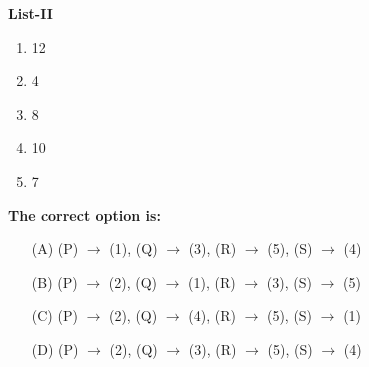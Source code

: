 \documentclass[12pt,a4paper]{article}
\begin{document}
\textbf{List-II}
\begin{enumerate}
\item 12 
\item 4
\item 8
\item 10
\item 7
\end{enumerate}

\textbf{The correct option is:}
\begin{enumerate}
    \item[(A)] (P) $\rightarrow$ (1), (Q) $\rightarrow$ (3), (R) $\rightarrow$ (5), (S) $\rightarrow$ (4)
    \item[(B)] (P) $\rightarrow$ (2), (Q) $\rightarrow$ (1), (R) $\rightarrow$ (3), (S) $\rightarrow$ (5)
    \item[(C)] (P) $\rightarrow$ (2), (Q) $\rightarrow$ (4), (R) $\rightarrow$ (5), (S) $\rightarrow$ (1)
    \item[(D)] (P) $\rightarrow$ (2), (Q) $\rightarrow$ (3), (R) $\rightarrow$ (5), (S) $\rightarrow$ (4)
\end{enumerate}
\end{document}
